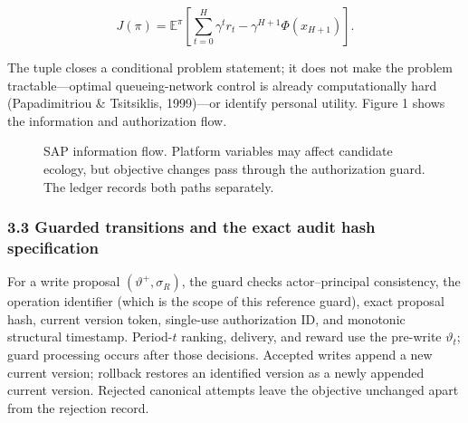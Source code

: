 \documentclass[
  11pt]{article}
\begin{document}
\[J(\pi)=\mathbb E^\pi\!\left[\sum_{t=0}^{H}\gamma^t r_t-\gamma^{H+1}\Phi(x_{H+1})\right].\tag{2}\]

The tuple closes a conditional problem statement; it does not make the
problem tractable---optimal queueing-network control is already
computationally hard (Papadimitriou \& Tsitsiklis, 1999)---or identify
personal utility. Figure 1 shows the information and authorization flow.

\begin{figure}[htbp]
\centering
{}
\caption{SAP information flow. Platform variables may affect candidate ecology, but objective changes pass through the authorization guard. The ledger records both paths separately.}
\label{fig:sap-flow}
\end{figure}

\subsubsection{3.3 Guarded transitions and the exact audit hash
specification}\label{guarded-transitions-and-the-exact-audit-hash-specification}

For a write proposal \((\vartheta^+,\sigma_R)\), the guard checks
actor--principal consistency, the operation identifier (which is the
scope of this reference guard), exact proposal hash, current version
token, single-use authorization ID, and monotonic structural timestamp.
Period-\(t\) ranking, delivery, and reward use the pre-write
\(\vartheta_t\); guard processing occurs after those decisions. Accepted
writes append a new current version; rollback restores an identified
version as a newly appended current version. Rejected canonical attempts
leave the objective unchanged apart from the rejection record.
\end{document}
